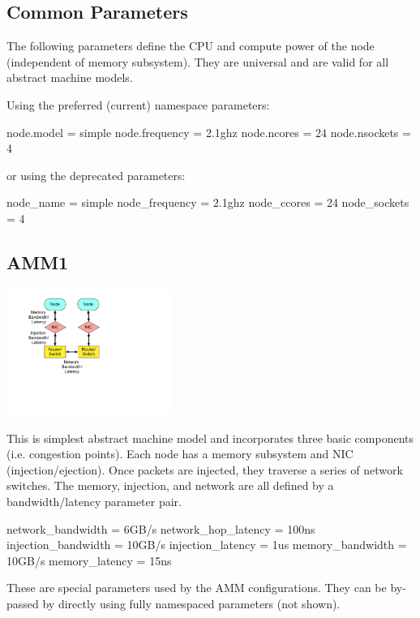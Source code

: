 \subsection{Common Parameters}
The following parameters define the CPU and compute power of the node (independent of memory subsystem).
They are universal and are valid for all abstract machine models.

Using the preferred (current) namespace parameters:
\begin{ViFile}
node.model = simple
node.frequency = 2.1ghz
node.ncores = 24
node.nsockets = 4
\end{ViFile}

or using the deprecated parameters:
\begin{ViFile}
node_name = simple
node_frequency = 2.1ghz
node_ccores = 24
node_sockets = 4
\end{ViFile}

\subsection{AMM1}
\label{subsec:ammOne}

\begin{center}
\includegraphics[width=0.4\textwidth]{figures/amm/AMM1.pdf}
\end{center}

This is simplest abstract machine model and incorporates three basic components (i.e. congestion points).
Each node has a memory subsystem and NIC (injection/ejection).
Once packets are injected, they traverse a series of network switches.
The memory, injection, and network are all defined by a bandwidth/latency parameter pair.

\begin{ViFile}
network_bandwidth = 6GB/s
network_hop_latency = 100ns
injection_bandwidth = 10GB/s
injection_latency = 1us
memory_bandwidth = 10GB/s
memory_latency = 15ns
\end{ViFile}

These are special parameters used by the AMM configurations.
They can be by-passed by directly using fully namespaced parameters (not shown).

